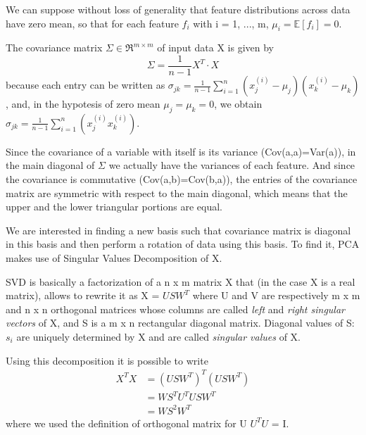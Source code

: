 \documentclass[11pt]{report}
\begin{document}
We can suppose without loss of generality that feature distributions across data have zero mean, so that for each feature $f_i$ with i = 1, ..., m, $\mu_i = \mathbb{E}[f_i]=0$.

The covariance matrix $\Sigma \in \Re^{m \times m}$ of input data X is given by
\begin{equation}
\Sigma = \frac{1}{n-1} X^T \cdot X
\end{equation}
because each entry can be written as $\sigma_{jk} = \frac{1}{n-1}\sum_{i = 1}^n (x^{(i)}_j - \mu_j)(x^{(i)}_k - \mu_k)$, and, in the hypotesis of zero mean $\mu_j = \mu_k = 0$, we obtain $\sigma_{jk} = \frac{1}{n-1}\sum_{i = 1}^n (x^{(i)}_j x^{(i)}_k)$.

\noindent Since the covariance of a variable with itself is its variance (Cov(a,a)=Var(a)), in the main diagonal of $\Sigma$ we actually have the variances of each feature. And since the covariance is commutative (Cov(a,b)=Cov(b,a)), the entries of the covariance matrix are symmetric with respect to the main diagonal, which means that the upper and the lower triangular portions are equal.

We are interested in finding a new basis such that covariance matrix is diagonal in this basis and then perform a rotation of data using this basis.
To find it, PCA makes use of Singular Values Decomposition of X.

SVD is basically a factorization of a n x m matrix X that (in the case X is a real matrix), allows to rewrite it as X = $U S W^T$ where U and V are respectively m x m  and n x n orthogonal matrices whose columns are called \emph{left} and \emph{right singular vectors} of X, and S is a  m x n rectangular diagonal matrix.
Diagonal values of S: $s_i$ are uniquely determined by X and are called \emph{singular values} of X.

Using this decomposition it is possible to write
\begin{equation}
\begin{aligned}
X^T X & = (U S W^T)^T(U S W^T) \\
& = W S^T U^T U S W^T \\
& = W S^2 W^T
\end{aligned}
\end{equation}
where we used the definition of orthogonal matrix for U $U^T U$ = I.
\end{document}
